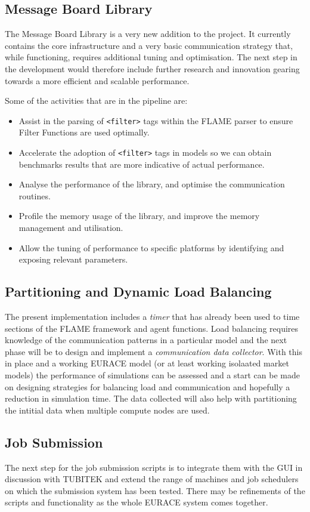 \subsection{Message Board Library}

The Message Board Library is a very new addition to the project. It currently contains the core infrastructure and a very basic communication strategy that, while functioning, requires additional tuning and optimisation. The next step in the development would therefore include further research and innovation gearing towards a more efficient and scalable performance. 

Some of the activities that are in the pipeline are:
\begin{itemize}
\item Assist in the parsing of \texttt{<filter>} tags within the FLAME parser to ensure Filter Functions are used optimally.
\item Accelerate the adoption of \texttt{<filter>} tags in models so we can obtain benchmarks results that are more indicative of actual performance.
\item Analyse the  performance of the library, and optimise the communication routines.
\item Profile the memory usage of the library, and improve the memory management and utilisation.
\item Allow the tuning of performance to specific platforms by identifying and exposing relevant parameters.
\end{itemize} 

\subsection{Partitioning and Dynamic Load Balancing}

The present implementation includes a \textit{timer} that has already been used to time sections of the FLAME framework and agent functions. Load balancing requires knowledge of the communication patterns in a particular model and the next phase will be to design and implement a \textit{communication data collector}. With this in place and a working EURACE model (or at least working isolaated market models) the performance of simulations can be assessed and a start can be made on designing strategies for balancing load and communication and hopefully a reduction in simulation time. The data collected will also help with partitioning the intitial data when multiple compute nodes are used.

\subsection{Job Submission}

The next step for the job submission scripts is to integrate them with the GUI in discussion with TUBITEK and extend the range of machines and job schedulers on which the submission system has been tested. There may be refinements of the scripts and functionality as the whole EURACE system comes together. 
